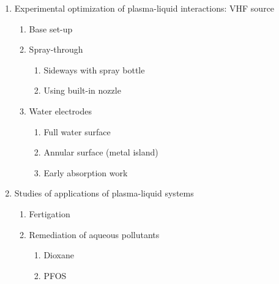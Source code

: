 \documentclass{article}
\begin{document}
\begin{enumerate}
  \item Experimental optimization of plasma-liquid interactions: VHF source
  \begin{enumerate}
    \item Base set-up
    \item Spray-through
    \begin{enumerate}
      \item Sideways with spray bottle
      \item Using built-in nozzle
    \end{enumerate}
    \item Water electrodes
    \begin{enumerate}
      \item Full water surface
      \item Annular surface (metal island)
      \item Early absorption work
    \end{enumerate}
  \end{enumerate}

  \item Studies of applications of plasma-liquid systems
  \begin{enumerate}
    \item Fertigation
    \item Remediation of aqueous pollutants
    \begin{enumerate}
      \item Dioxane
      \item PFOS
    \end{enumerate}
  \end{enumerate}
\end{enumerate}  
\end{document}
